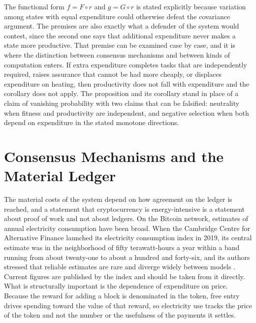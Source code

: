 \documentclass[11pt]{article}
\theoremstyle{remark}
\begin{document}
The functional form $f=F\circ r$ and $g=G\circ r$ is stated explicitly because variation among states with equal expenditure could otherwise defeat the covariance argument. The premises are also exactly what a defender of the system would contest, since the second one says that additional expenditure never makes a state more productive. That premise can be examined case by case, and it is where the distinction between consensus mechanisms and between kinds of computation enters. If extra expenditure completes tasks that are independently required, raises assurance that cannot be had more cheaply, or displaces expenditure on heating, then productivity does not fall with expenditure and the corollary does not apply. The proposition and its corollary stand in place of a claim of vanishing probability with two claims that can be falsified: neutrality when fitness and productivity are independent, and negative selection when both depend on expenditure in the stated monotone directions.

\section{Consensus Mechanisms and the Material Ledger}\label{sec:material}

The material costs of the system depend on how agreement on the ledger is reached, and a statement that cryptocurrency is energy-intensive is a statement about proof of work and not about ledgers. On the Bitcoin network, estimates of annual electricity consumption have been broad. When the Cambridge Centre for Alternative Finance launched its electricity consumption index in 2019, its central estimate was in the neighborhood of fifty terawatt-hours a year within a band running from about twenty-one to about a hundred and forty-six, and its authors stressed that reliable estimates are rare and diverge widely between models \cite{cbeci2019}. Current figures are published by the index and should be taken from it directly. What is structurally important is the dependence of expenditure on price. Because the reward for adding a block is denominated in the token, free entry drives spending toward the value of that reward, so electricity use tracks the price of the token and not the number or the usefulness of the payments it settles.
\end{document}
